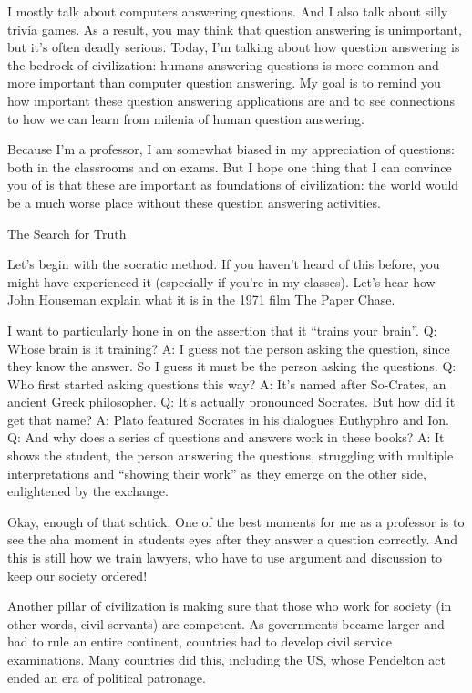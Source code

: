 I mostly talk about computers answering questions.  And I also talk about silly trivia games.  As a result, you may think that question answering is unimportant, but it’s often deadly serious.  Today, I’m talking about how question answering is the bedrock of civilization: humans answering questions is more common and more important than computer question answering.  My goal is to remind you how important these question answering applications are and to see connections to how we can learn from milenia of human question answering.

Because I’m a professor, I am somewhat biased in my appreciation of questions: both in the classrooms and on exams.  But I hope one thing that I can convince you of is that these are important as foundations of civilization: the world would be a much worse place without these question answering activities.

The Search for Truth

Let’s begin with the socratic method.  If you haven’t heard of this before, you might have experienced it (especially if you’re in my classes).  Let’s hear how John Houseman explain what it is in the 1971 film The Paper Chase.

I want to particularly hone in on the assertion that it “trains your brain”.  
Q: Whose brain is it training?
A: I guess not the person asking the question, since they know the answer.  So I guess it must be the person asking the questions.
Q: Who first started asking questions this way?
A: It’s named after So-Crates, an ancient Greek philosopher.
Q: It’s actually pronounced Socrates.  But how did it get that name?
A: Plato featured Socrates in his dialogues Euthyphro and Ion.
Q: And why does a series of questions and answers work in these books?
A: It shows the student, the person answering the questions, struggling with multiple interpretations and “showing their work” as they emerge on the other side, enlightened by the exchange.

Okay, enough of that schtick.  One of the best moments for me as a professor is to see the aha moment in students eyes after they answer a question correctly.  And this is still how we train lawyers, who have to use argument and discussion to keep our society ordered!

Another pillar of civilization is making sure that those who work for society (in other words, civil servants) are competent.  As governments became larger and had to rule an entire continent, countries had to develop civil service examinations.  Many countries did this, including the US, whose Pendelton act ended an era of political patronage. 

